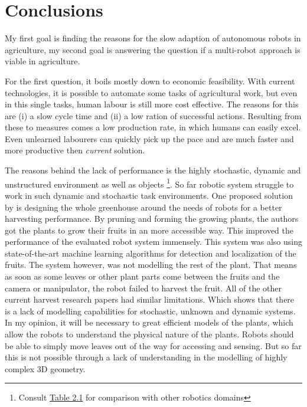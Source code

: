 

    \chapter{Conclusions}

    My first goal is finding the reasons for the slow adaption of autonomous robots in agriculture, my second goal is answering the question if a multi-robot approach is viable in agriculture.
    
    For the first question, it boils mostly down to economic feasibility. With current technologies, it is possible to automate some tasks of agricultural work, but even in this single tasks, human labour is still more cost effective. The reasons for this are (i) a slow cycle time and (ii)  a low ration of successful actions. Resulting from these to measures comes a low production rate, in which humans can easily excel. Even unlearned labourers can quickly pick up the pace and are much faster and more productive then \emph{current} solution. \cite{Bechar2017}

    The reasons behind the lack of performance is the highly stochastic, dynamic and unstructured environment as well as objects \footnote{Consult \hyperref[table:objects_and_tasks]{Table 2.1} for comparison with other robotics domains}. So far robotic system struggle to work in such dynamic and stochastic task environments. 
    One proposed solution by \cite{Herck2020} is designing the whole greenhouse around the needs of robots for a better harvesting performance. By pruning and forming the growing plants, the authors got the plants to grow their fruits in an more accessible way. This improved the performance of the evaluated robot system immensely. This system was also using state-of-the-art machine learning algorithms for detection and localization of the fruits. The system however, was not modelling the rest of the plant. That means as soon as some leaves or other plant parts come between the fruits and the camera or manipulator, the robot failed to harvest the fruit. 
    All of the other current harvest research papers had similar limitations. Which shows that there is a lack of modelling capabilities for stochastic, unknown and dynamic systems. In my opinion, it will be necessary to great efficient models of the plants, which allow the robots to understand the physical nature of the plants. Robots should be able to simply move leaves out of the way for accessing and sensing. But so far this is not possible through a lack of understanding in the modelling of highly complex 3D geometry.


